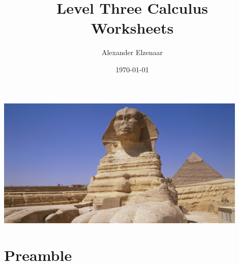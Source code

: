 \documentclass[a4paper,11pt]{amsbook}
\title{Level Three Calculus\\Worksheets}
\author{Alexander Elzenaar}
\date{\today}
\begin{document}
  \begin{titlepage}
    \centering

    \vspace*{\fill}

    \makeatletter

    \Huge{\textbf{\@title}}

    \vspace*{2cm}

    \includegraphics[width=0.9\textwidth]{bookcover}

    \vspace*{2cm}

    \Large\textit{\authors}

    \vspace*{\fill}

    \makeatother
  \end{titlepage}

  \tableofcontents

  \chapter{Preamble}
  
\end{document}
